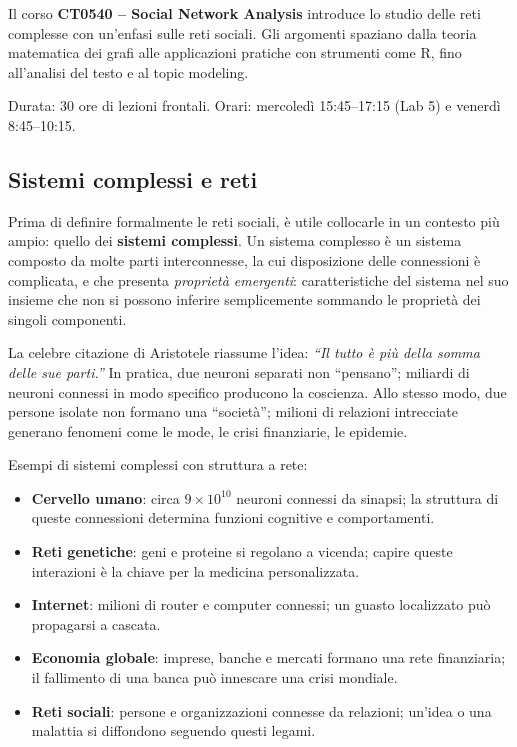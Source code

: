 \documentclass[12pt,a4paper]{article}
\begin{document}
Il corso \textbf{CT0540 – Social Network Analysis} introduce lo studio delle reti complesse
con un'enfasi sulle reti sociali. Gli argomenti spaziano dalla teoria matematica dei grafi
alle applicazioni pratiche con strumenti come R, fino all'analisi del testo e al topic modeling.

Durata: 30 ore di lezioni frontali. Orari: mercoledì 15:45–17:15 (Lab 5) e venerdì 8:45–10:15.

\subsection{Sistemi complessi e reti}

Prima di definire formalmente le reti sociali, è utile collocarle in un contesto più ampio:
quello dei \textbf{sistemi complessi}. Un sistema complesso è un sistema composto da molte
parti interconnesse, la cui disposizione delle connessioni è complicata, e che presenta
\emph{proprietà emergenti}: caratteristiche del sistema nel suo insieme che non si possono
inferire semplicemente sommando le proprietà dei singoli componenti.

La celebre citazione di Aristotele riassume l'idea: \textit{``Il tutto è più della somma delle sue parti.''}
In pratica, due neuroni separati non ``pensano''; miliardi di neuroni connessi in modo specifico
producono la coscienza. Allo stesso modo, due persone isolate non formano una ``società''; milioni
di relazioni intrecciate generano fenomeni come le mode, le crisi finanziarie, le epidemie.

Esempi di sistemi complessi con struttura a rete:
\begin{itemize}
  \item \textbf{Cervello umano}: circa $9 \times 10^{10}$ neuroni connessi da sinapsi;
        la struttura di queste connessioni determina funzioni cognitive e comportamenti.
  \item \textbf{Reti genetiche}: geni e proteine si regolano a vicenda; capire queste
        interazioni è la chiave per la medicina personalizzata.
  \item \textbf{Internet}: milioni di router e computer connessi; un guasto localizzato
        può propagarsi a cascata.
  \item \textbf{Economia globale}: imprese, banche e mercati formano una rete finanziaria;
        il fallimento di una banca può innescare una crisi mondiale.
  \item \textbf{Reti sociali}: persone e organizzazioni connesse da relazioni; un'idea o
        una malattia si diffondono seguendo questi legami.
\end{itemize}
\end{document}
